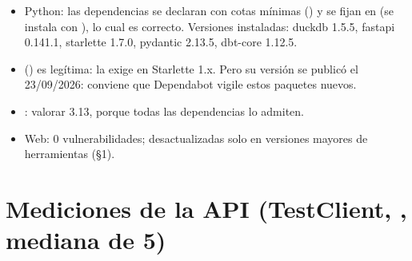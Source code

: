 \begin{itemize}
\item Python: las dependencias se declaran con cotas mínimas (\code{>=\allowbreak{}}) y se fijan en  (se instala con ), lo cual es correcto. Versiones instaladas: duckdb 1.5.5, fastapi 0.141.1, starlette 1.7.0, pydantic 2.13.5, dbt-core 1.12.5.
\item {} () es legítima: la exige  en Starlette 1.x. Pero su versión se publicó el 23/09/2026: conviene que Dependabot vigile estos paquetes nuevos.
\item {}: valorar 3.13, porque todas las dependencias lo admiten.
\item Web: 0 vulnerabilidades; desactualizadas solo en versiones mayores de herramientas (§1).
\end{itemize}

\section{Mediciones de la API (TestClient, , mediana de 5)}

